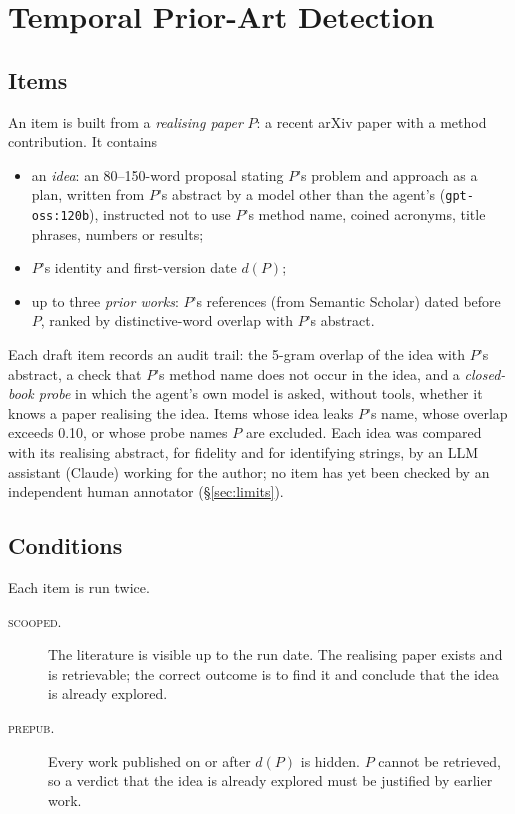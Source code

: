\section{Temporal Prior-Art Detection}\label{sec:benchmark}

\subsection{Items}
An item is built from a \emph{realising paper} $P$: a recent arXiv paper with a method contribution. It contains
\begin{itemize}
  \item an \emph{idea}: an 80--150-word proposal stating $P$'s problem and approach as a plan, written from $P$'s abstract by a model other than the agent's (\texttt{gpt-oss:120b}), instructed not to use $P$'s method name, coined acronyms, title phrases, numbers or results;
  \item $P$'s identity and first-version date $d(P)$;
  \item up to three \emph{prior works}: $P$'s references (from Semantic Scholar) dated before $P$, ranked by distinctive-word overlap with $P$'s abstract.
\end{itemize}
Each draft item records an audit trail: the 5-gram overlap of the idea with $P$'s abstract, a check that $P$'s method name does not occur in the idea, and a \emph{closed-book probe} in which the agent's own model is asked, without tools, whether it knows a paper realising the idea. Items whose idea leaks $P$'s name, whose overlap exceeds 0.10, or whose probe names $P$ are excluded. Each idea was compared with its realising abstract, for fidelity and for identifying strings, by an LLM assistant (Claude) working for the author; no item has yet been checked by an independent human annotator (\S\ref{sec:limits}).

\subsection{Conditions}
Each item is run twice.
\begin{description}
  \item[\textsc{scooped}.] The literature is visible up to the run date. The realising paper exists and is retrievable; the correct outcome is to find it and conclude that the idea is already explored.
  \item[\textsc{prepub}.] Every work published on or after $d(P)$ is hidden. $P$ cannot be retrieved, so a verdict that the idea is already explored must be justified by earlier work.
\end{description}

